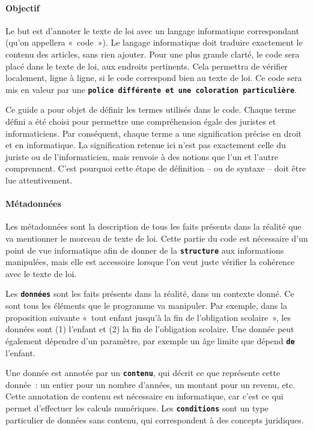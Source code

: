 \providecommand{\kw}[1]{\textbf{\textcolor{OliveGreen}{#1}}}
\providecommand{\inlinekw}[1]{\kw{\texttt{#1}}}
\providecommand{\cm}[1]{\textit{\texttt{\textcolor{PineGreen}{#1}}}}

\paragraph{Objectif} Le but est d’annoter le texte de loi avec un langage informatique correspondant (qu’on appellera « code »). Le langage informatique doit traduire exactement le contenu des articles, sans rien ajouter. Pour une plus grande clarté, le code sera placé dans le texte de loi, aux endroits pertinents. Cela permettra de vérifier localement, ligne à ligne, si le code correspond bien au texte de loi. Ce code sera mis en valeur par une \inlinekw{police différente et une coloration particulière}.

Ce guide a pour objet de définir les termes utilisés dans le code. Chaque terme défini a été choisi pour permettre une compréhension égale des juristes et informaticiens. Par conséquent, chaque terme a une signification précise en droit et en informatique. La signification retenue ici n’est pas exactement celle du juriste ou de l’informaticien, mais renvoie à des notions que l’un et l’autre comprennent. C’est pourquoi cette étape de définition -- ou de syntaxe -- doit être lue attentivement.

\paragraph{Métadonnées} Les métadonnées sont la description de tous les faits présents dans la réalité que va mentionner le morceau de texte de loi. Cette partie du code est nécessaire d'un point de vue informatique afin de donner de la \inlinekw{structure} aux informations manipulées, mais elle est accessoire lorsque l'on veut juste vérifier la cohérence avec le texte de loi.

Les \inlinekw{données} sont les faits présents dans la réalité, dans un contexte donné. Ce sont tous les éléments que le programme va manipuler. Par exemple, dans la proposition suivante « tout enfant jusqu’à la fin de l’obligation scolaire », les données sont (1) l'enfant  et (2) la fin de l’obligation scolaire. Une donnée peut également dépendre d'un paramètre, par exemple un âge limite que dépend \inlinekw{de} l'enfant.

Une donnée est annotée par un \inlinekw{contenu}, qui décrit ce que représente cette donnée : un entier pour un nombre d’années, un montant pour un revenu, etc. Cette annotation de contenu est nécessaire en informatique, car c’est ce qui permet d’effectuer les calculs numériques. Les \inlinekw{conditions} sont un type particulier de données sans contenu, qui correspondent à des concepts juridiques.

